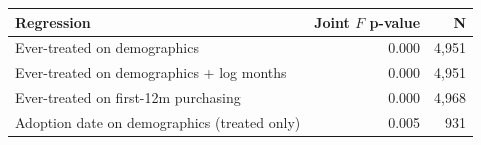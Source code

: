 \begin{tabular}{lrr}\toprule
Regression & Joint $F$ p-value & N \\\midrule
Ever-treated on demographics & 0.000 & 4,951 \\
Ever-treated on demographics + log months & 0.000 & 4,951 \\
Ever-treated on first-12m purchasing & 0.000 & 4,968 \\
Adoption date on demographics (treated only) & 0.005 & 931 \\
\bottomrule\end{tabular}
